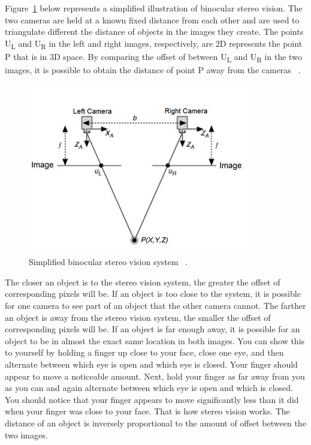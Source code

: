 Figure~\ref{fig:sv_diagram} below represents a simplified illustration of binocular stereo vision. The two cameras are held at a known fixed distance from each other and are used to triangulate different the distance of objects in the images they create. The points U\textsubscript{L} and U\textsubscript{R} in the left and right images, respectively, are 2D represents the point P that is in 3D space. By comparing the offset of between U\textsubscript{L} and U\textsubscript{R} in the two images, it is possible to obtain the distance of point P away from the cameras ~\cite{stereoVisionDiagram}.

\begin{figure}
	\begin{center}
		\includegraphics{figures/stereoVisionDiagram.jpg}
		\captionfonts
		\caption{Simplified binocular stereo vision system ~\cite{stereoVisionDiagram}.}
		\label{fig:sv_diagram}
	\end{center}
\end{figure}

The closer an object is to the stereo vision system, the greater the offset of corresponding pixels will be. If an object is too close to the system, it is possible for one camera to see part of an object that the other camera cannot. The farther an object is away from the stereo vision system, the smaller the offset of corresponding pixels will be. If an object is far enough away, it is possible for an object to be in almost the exact same location in both images. You can show this to yourself by holding a finger up close to your face, close one eye, and then alternate between which eye is open and which eye is closed. Your finger should appear to move a noticeable amount. Next, hold your finger as far away from you as you can and again alternate between which eye is open and which is closed. You should notice that your finger appears to move significantly less than it did when your finger was close to your face. That is how stereo vision works. The distance of an object is inversely proportional to the amount of offset between the two images.

